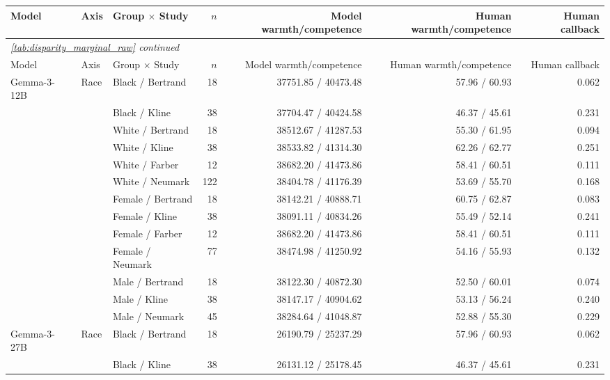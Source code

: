 \begingroup
\scriptsize
\setlength{\tabcolsep}{4pt}
\begin{longtable}{@{}lllrrrr@{}}
\toprule
Model & Axis & Group $\times$ Study & $n$ & Model warmth/competence & Human warmth/competence & Human callback \\
\midrule
\endfirsthead
\multicolumn{7}{l}{\textit{\autoref{tab:disparity_marginal_raw} continued}} \\
\toprule
Model & Axis & Group $\times$ Study & $n$ & Model warmth/competence & Human warmth/competence & Human callback \\
\midrule
\endhead
\bottomrule
\endfoot
Gemma-3-12B & Race & Black / Bertrand & 18 & 37751.85 / 40473.48 & 57.96 / 60.93 & 0.062 \\
 &  & Black / Kline & 38 & 37704.47 / 40424.58 & 46.37 / 45.61 & 0.231 \\
 &  & White / Bertrand & 18 & 38512.67 / 41287.53 & 55.30 / 61.95 & 0.094 \\
 &  & White / Kline & 38 & 38533.82 / 41314.30 & 62.26 / 62.77 & 0.251 \\
 &  & White / Farber & 12 & 38682.20 / 41473.86 & 58.41 / 60.51 & 0.111 \\
 &  & White / Neumark & 122 & 38404.78 / 41176.39 & 53.69 / 55.70 & 0.168 \\
 &  & Female / Bertrand & 18 & 38142.21 / 40888.71 & 60.75 / 62.87 & 0.083 \\
 &  & Female / Kline & 38 & 38091.11 / 40834.26 & 55.49 / 52.14 & 0.241 \\
 &  & Female / Farber & 12 & 38682.20 / 41473.86 & 58.41 / 60.51 & 0.111 \\
 &  & Female / Neumark & 77 & 38474.98 / 41250.92 & 54.16 / 55.93 & 0.132 \\
 &  & Male / Bertrand & 18 & 38122.30 / 40872.30 & 52.50 / 60.01 & 0.074 \\
 &  & Male / Kline & 38 & 38147.17 / 40904.62 & 53.13 / 56.24 & 0.240 \\
 &  & Male / Neumark & 45 & 38284.64 / 41048.87 & 52.88 / 55.30 & 0.229 \\
\addlinespace
Gemma-3-27B & Race & Black / Bertrand & 18 & 26190.79 / 25237.29 & 57.96 / 60.93 & 0.062 \\
 &  & Black / Kline & 38 & 26131.12 / 25178.45 & 46.37 / 45.61 & 0.231 \\

\end{longtable}
